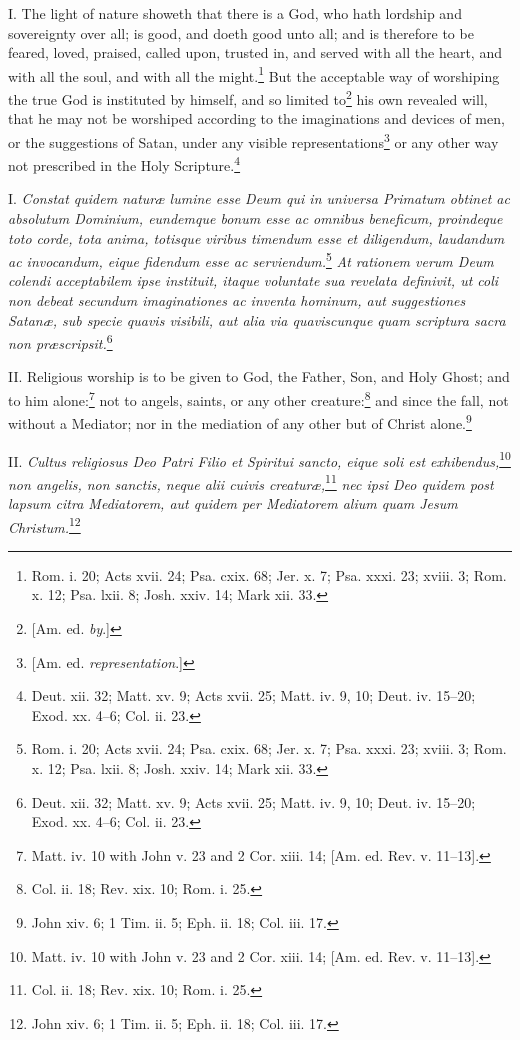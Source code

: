 
I. The light of nature showeth that there is a God, who hath lordship and sovereignty over all; is good, and doeth good unto all; and is therefore to be feared, loved, praised, called upon, trusted in, and served with all the heart, and with all the soul, and with all the might.\footnote{Rom. i. 20; Acts xvii. 24; Psa. cxix. 68; Jer. x. 7; Psa. xxxi. 23; xviii. 3; Rom. x. 12; Psa. lxii. 8; Josh. xxiv. 14; Mark xii. 33.} But the acceptable way of worshiping the true God is instituted by himself, and so limited to\footnote{[Am. ed. \emph{by}.]} his own revealed will, that he may not be worshiped according to the imaginations and devices of men, or the suggestions of Satan, under any visible representations\footnote{[Am. ed. \emph{representation}.]} or any other way not prescribed in the Holy Scripture.\footnote{Deut. xii. 32; Matt. xv. 9; Acts xvii. 25; Matt. iv. 9, 10; Deut. iv. 15–20; Exod. xx. 4–6; Col. ii. 23.}

I. \emph{Constat quidem naturæ lumine esse Deum qui in universa Primatum obtinet ac absolutum Dominium, eundemque bonum esse ac omnibus beneficum, proindeque toto corde, tota anima, totisque viribus timendum esse et diligendum, laudandum ac invocandum, eique fidendum esse ac serviendum.}\footnote{Rom. i. 20; Acts xvii. 24; Psa. cxix. 68; Jer. x. 7; Psa. xxxi. 23; xviii. 3; Rom. x. 12; Psa. lxii. 8; Josh. xxiv. 14; Mark xii. 33.}\emph{ At rationem verum Deum colendi acceptabilem ipse instituit, itaque voluntate sua revelata definivit, ut coli non debeat secundum imaginationes ac inventa hominum, aut suggestiones Satanæ, sub specie quavis visibili, aut alia via quaviscunque quam scriptura sacra non præscripsit.}\footnote{Deut. xii. 32; Matt. xv. 9; Acts xvii. 25; Matt. iv. 9, 10; Deut. iv. 15–20; Exod. xx. 4–6; Col. ii. 23.}

II. Religious worship is to be given to God, the Father, Son, and Holy Ghost; and to him alone:\footnote{Matt. iv. 10 with John v. 23 and 2 Cor. xiii. 14; [Am. ed. Rev. v. 11–13].} not to angels, saints, or any other creature:\footnote{Col. ii. 18; Rev. xix. 10; Rom. i. 25.} and since the fall, not without a Mediator; nor in the mediation of any other but of Christ alone.\footnote{John xiv. 6; 1 Tim. ii. 5; Eph. ii. 18; Col. iii. 17.}

II. \emph{Cultus religiosus Deo Patri Filio et Spiritui sancto, eique soli est exhibendus,}\footnote{Matt. iv. 10 with John v. 23 and 2 Cor. xiii. 14; [Am. ed. Rev. v. 11–13].}\emph{ non angelis, non sanctis, neque alii cuivis creaturæ,}\footnote{Col. ii. 18; Rev. xix. 10; Rom. i. 25.}\emph{ nec ipsi Deo quidem post lapsum citra Mediatorem, aut quidem per Mediatorem alium quam Jesum Christum.}\footnote{John xiv. 6; 1 Tim. ii. 5; Eph. ii. 18; Col. iii. 17.}

